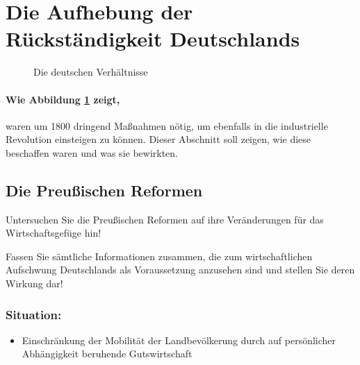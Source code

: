 \section{Die Aufhebung der Rückständigkeit Deutschlands}
\label{sec:aufh-rueck-d}

\begin{figure}
\centering
\begin{sideways}

\end{sideways}
\caption{Die deutschen Verhältnisse}
\label{pic:dt-verh}
\end{figure}

\paragraph{Wie Abbildung \ref{pic:dt-verh} zeigt,} waren um 1800
dringend Maßnahmen nötig, um ebenfalls in die industrielle Revolution
einsteigen zu können. Dieser Abschnitt soll zeigen, wie diese
beschaffen waren und was sie bewirkten.

\subsection{Die Preußischen Reformen}

\begin{aufgabe}
Untersuchen Sie die Preußischen Reformen auf ihre Veränderungen
für das Wirtschaftsgefüge hin!

Fassen Sie sämtliche Informationen zusammen,
die zum wirtschaftlichen Aufschwung Deutschlands als Voraussetzung
anzusehen sind und stellen Sie deren Wirkung dar!
\end{aufgabe}

\subsubsection{Situation:}

\begin{itemize}
\item Einschränkung der Mobilität der Landbevölkerung durch auf
persönlicher Abhängigkeit beruhende Gutswirtschaft
\end{itemize}



\subsection{}
\label{ssc:frueh-ind}


